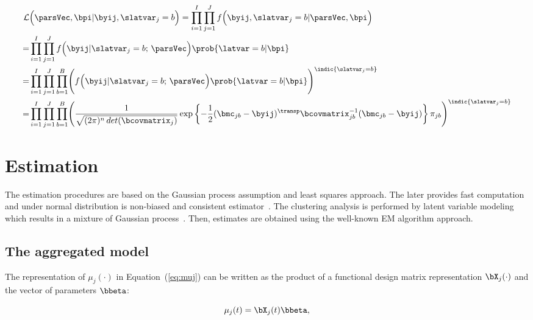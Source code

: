 \begin{align}
  \mathcal{L}&
  \Bigl(
  \parsVec, \bpi | \byij, \slatvar_j=b 
  \Bigr)
  =
     \prod_{i=1}^I
     \prod_{j=1}^J
     f \Bigl( \byij, \slatvar_j=b | \parsVec, \bpi \Bigr) \\
  = &
      \prod_{i=1}^I
     \prod_{j=1}^J
      f \Bigl( \byij | \slatvar_j=b ; \, \parsVec \Bigr)
      \prob{\latvar = b | \bpi}  \\
  = &
      \prod_{i=1}^I
      \prod_{j=1}^J
      \prod_{b=1}^B
      \Biggl(
      f \Bigl( \byij | \slatvar_j=b ; \, \parsVec \Bigr)
      \prob{\latvar = b | \bpi}
      \Biggr)^{\indic{\slatvar_j = b}}\\
  =&
     \prod_{i=1}^I
     \prod_{j=1}^J
     \prod_{b=1}^B
     \Biggr(
     \frac{1}{\sqrt{(2 \pi)^n \, det(\bcovmatrix_j)}} %
     \exp
     \left\{
     -\frac{1}{2}
     (\bmc_{jb} - \byij)^\transp
     \bcovmatrix_{jb}^{-1}
     (\bmc_{jb} - \byij)
    \right\} %
     \pi_{jb}
      \Biggr)^{\indic{\slatvar_j = b}}
      \label{eq:clusterlk}
\end{align}


\section{Estimation}
\label{sec:estimation}

The estimation procedures are based on the Gaussian process assumption and least squares approach. The later provides fast computation and under normal distribution is non-biased and consistent estimator~\cite{shi2011gaussian}. The clustering analysis is performed by latent variable modeling which results in a mixture of Gaussian process~\cite{tresp2001mixtures}. Then, estimates are obtained using the well-known EM algorithm approach.

\subsection{The aggregated model}\label{sec:aggrestimate}

The representation of $\mu_j(\cdot)$ in Equation~(\ref{eq:muj}) can be written as the product of a functional design matrix representation $\bX_j(\cdot)$ and the vector of parameters $\bbeta$:

\begin{equation}
  \label{eq:design}
  \mu_j(t) = \bX_j(t) \bbeta,
\end{equation}

